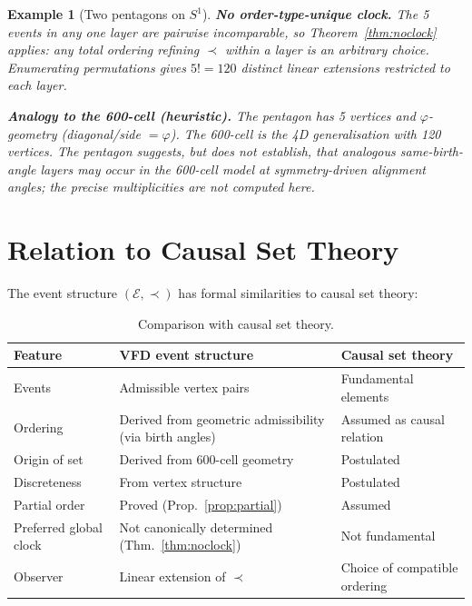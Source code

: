 \documentclass[12pt]{article}
\newtheorem{example}[theorem]{Example}
\newcommand{\Ecal}{\mathcal{E}}
\begin{document}
\begin{example}[Two pentagons on $S^1$]
\textbf{No order-type-unique clock.} The 5 events in any one layer are pairwise incomparable, so Theorem~\ref{thm:noclock} applies: any total ordering refining $\prec$ within a layer is an arbitrary choice. Enumerating permutations gives $5! = 120$ distinct linear extensions restricted to each layer.

\textbf{Analogy to the 600-cell (heuristic).} The pentagon has 5 vertices and $\varphi$-geometry (diagonal/side $= \varphi$). The 600-cell is the 4D generalisation with 120 vertices. The pentagon suggests, but does not establish, that analogous same-birth-angle layers may occur in the 600-cell model at symmetry-driven alignment angles; the precise multiplicities are not computed here.
\end{example}

\section{Relation to Causal Set Theory}\label{sec:causal}

The event structure $(\Ecal, \prec)$ has formal similarities to causal set theory:

\begin{table}[ht]
\centering
\caption{Comparison with causal set theory.}
\label{tab:causal}
\begin{tabular}{@{}lll@{}}
\toprule
Feature & VFD event structure & Causal set theory \\
\midrule
Events & Admissible vertex pairs & Fundamental elements \\
Ordering & Derived from geometric admissibility (via birth angles) & Assumed as causal relation \\
Origin of set & Derived from 600-cell geometry & Postulated \\
Discreteness & From vertex structure & Postulated \\
Partial order & Proved (Prop.~\ref{prop:partial}) & Assumed \\
Preferred global clock & Not canonically determined (Thm.~\ref{thm:noclock}) & Not fundamental \\
Observer & Linear extension of $\prec$ & Choice of compatible ordering \\
\bottomrule
\end{tabular}
\end{table}
\end{document}
